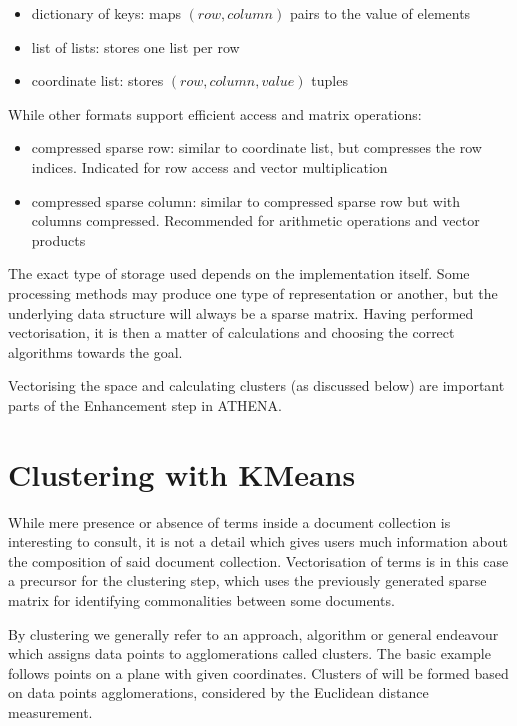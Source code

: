 \begin{itemize}
\item dictionary of keys: maps $(row, column)$ pairs to the value of elements
\item list of lists: stores one list per row
\item coordinate list: stores $(row, column, value)$ tuples
\end{itemize}

While other formats support efficient access and matrix operations:

\begin{itemize}
\item compressed sparse row: similar to coordinate list, but compresses the row indices. Indicated for row access and vector multiplication
\item compressed sparse column: similar to compressed sparse row but with columns compressed. Recommended for arithmetic operations and vector products
\end{itemize}

The exact type of storage used depends on the implementation itself. Some processing methods may produce one type of representation or another, but the underlying data structure will always be a sparse matrix. Having performed vectorisation, it is then a matter of calculations and choosing the correct algorithms towards the goal.

Vectorising the space and calculating clusters (as discussed below) are important parts of the Enhancement step in ATHENA.

\section{Clustering with KMeans}
While mere presence or absence of terms inside a document collection is interesting to consult, it is not a detail which gives users much information about the composition of said document collection. Vectorisation of terms is in this case a precursor for the clustering step, which uses the previously generated sparse matrix for identifying commonalities between some documents.

By clustering we generally refer to an approach, algorithm or general endeavour which assigns data points to agglomerations called clusters. The basic example follows points on a plane with given coordinates. Clusters of will be formed based on data points agglomerations, considered by the Euclidean distance measurement.

